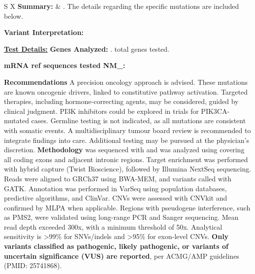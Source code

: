 \documentclass[11pt]{extarticle}
\newcommand{\data}[1]{}
\newenvironment{dataiter}[1]{}{}
\begin{document}
\begin{tabularx}{\textwidth}{S X}
{\bf \large Summary: } & \data{plugin:summary_blurb}. The details regarding the specific mutations are included below. 
\end{tabularx}

\newpage
\vspace{2em}
{\Huge \bf Variant Interpretation: } 
\newline
\data{plugin:long_blurb}


{\huge \bf \underline{Test Details:}} \newline
\newline
{\bf \Large Genes Analyzed: } \begin{dataiter}{tested_genes}\data{gene_symbol}. \end{dataiter} 
\data{num_tested_genes} total genes tested. 

{\bf \large mRNA ref sequences tested NM\_:}
\begin{dataiter}{tested_genes}\data{refseq_mrna} \end{dataiter}\newline \newline

{\Large \bf Recommendations \newline}
A precision oncology approach is advised. These mutations are known oncogenic drivers, linked to constitutive pathway activation. Targeted therapies, including hormone-correcting agents, may be considered, guided by clinical judgment. PI3K inhibitors could be explored in trials for PIK3CA-mutated cases. Germline testing is not indicated, as all mutations are consistent with somatic events. A multidisciplinary tumour board review is recommended to integrate findings into care. Additional testing may be pursued at the physician’s discretion. 
\newline 
\newline
{\Large \bf Methodology \newline}
\data{sample_type} was sequenced with \data{sequencing_scope} and was analyzed using \data{analysis_type} covering all coding exons and adjacent intronic regions. Target enrichment was performed with hybrid capture (Twist Bioscience), followed by Illumina NextSeq sequencing. Reads were aligned to GRCh37 using BWA-MEM, and variants called with GATK. Annotation was performed in VarSeq using population databases, predictive algorithms, and ClinVar. CNVs were assessed with CNVkit and confirmed by MLPA when applicable. Regions with pseudogene interference, such as PMS2, were validated using long-range PCR and Sanger sequencing. Mean read depth exceeded 300x, with a minimum threshold of 50x. Analytical sensitivity is >99\% for SNVs/indels and >95\% for exon-level CNVs. {\bf Only variants classified as pathogenic, likely pathogenic, or variants of uncertain significance (VUS) are reported}, per ACMG/AMP guidelines (PMID: 25741868).
\end{document}
